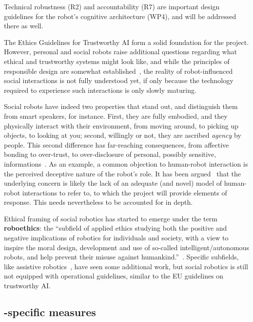 Technical robustness (R2) and accountability (R7) are important design
guidelines for the robot's cognitive architecture (WP4), and will be addressed
there as well.


The Ethics Guidelines for Trustworthy AI form a solid foundation for the
project. However, personal and social robots raise additional questions
regarding what ethical and trustworthy systems might look like, and while the
principles of responsible design are somewhat established~\cite{stahl2016ethics,
bsi2016robots}, the reality of robot-influenced social interactions is not
fully understood yet, if only because the technology required to experience such
interactions is only slowly maturing. 

Social robots have indeed two properties that stand out, and distinguish them
from smart speakers, for instance.  First, they are fully embodied, and they
physically interact with their environment, from moving around, to picking up
objects, to looking at you; second, willingly or not, they are ascribed
\emph{agency} by people. This second difference has far-reaching consequences,
from affective bonding to over-trust, to over-disclosure of personal, possibly
sensitive, informations~\cite{martelaro2016tell,shiomi2017robot}.  As an
example, a common objection to human-robot interaction is the perceived
deceptive nature of the robot's role. It has been
argued~\cite{biscontilucidi2018companion} that the underlying concern is likely
the lack of an adequate (and novel) model of human-robot interactions to refer
to, to which the project will provide elements of response. This needs
nevertheless to be accounted for in depth.

Ethical framing of social robotics has started to
emerge under the term \textbf{roboethics}: the ``subfield of applied ethics
studying both the positive and negative implications of robotics for individuals
and society, with a view to inspire the moral design, development and use of
so-called intelligent/autonomous robots, and help prevent their misuse against
humankind.''~\cite{allen2011robot}. Specific subfields, like assistive
robotics~\cite{sharkey2012granny}, have seen some additional work, but social
robotics is still not equipped with operational guidelines, similar to the EU
guidelines on trustworthy AI.

\subsection{\project-specific measures}

